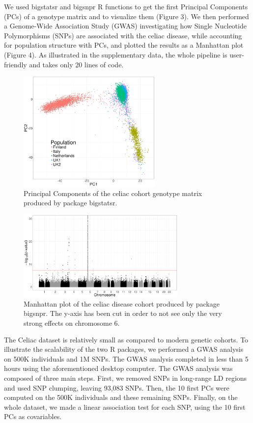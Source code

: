 \documentclass{bioinfo}
\begin{document}
We used bigstatsr and bigsnpr R functions to get the first Principal Components (PCs) of a genotype matrix and to visualize them (Figure 3). We then performed a Genome-Wide Association Study (GWAS) investigating how Single Nucleotide Polymorphisms (SNPs) are associated with the celiac disease, while accounting for population structure with PCs, and plotted the results as a Manhattan plot (Figure 4). As illustrated in the supplementary data, the whole pipeline is user-friendly and takes only 20 lines of code.


\begin{figure}[!tpb]
\centerline{\includegraphics[width=200pt]{celiac-pca}}
\caption{Principal Components of the celiac cohort genotype matrix produced by package bigstatsr.}\label{fig:pca}
\end{figure}

\begin{figure}[!tpb]
\centerline{\includegraphics[width=235pt]{celiac-gwas-cut}}
\caption{Manhattan plot of the celiac disease cohort produced by package bigsnpr. The y-axis has been cut in order to not see only the very strong effects on chromosome 6.}\label{fig:gwas}
\end{figure}

The Celiac dataset is relatively small as compared to modern genetic cohorts. To illustrate the scalability of the two R packages, we performed a GWAS analysis on 500K individuals and 1M SNPs. The GWAS analysis completed in less than 5 hours using the aforementioned desktop computer. The GWAS analysis was composed of three main steps. First, we removed SNPs in long-range LD regions and used SNP clumping, leaving 93,083 SNPs. Then, the 10 first PCs were computed on the 500K individuals and these remaining SNPs. Finally, on the whole dataset, we made a linear association test for each SNP, using the 10 first PCs as covariables.
\end{document}
